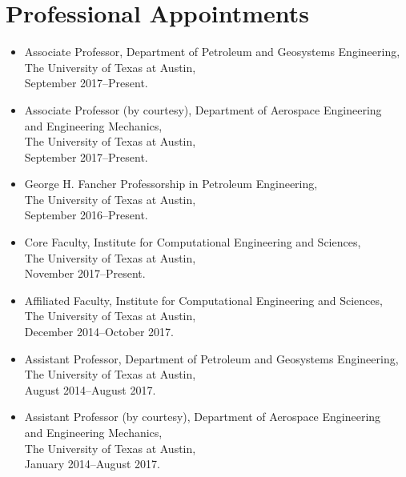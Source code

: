 \ifdefined\ispdf
\section*{Professional Appointments}

\begin{itemize}
    \item Associate Professor, Department of Petroleum and Geosystems Engineering, \\ 
          The University of Texas at Austin, \\
          September 2017--Present. 

    \item Associate Professor (by courtesy), Department of Aerospace Engineering \\ 
          and Engineering Mechanics, \\ 
          The University of Texas at Austin, \\
          September 2017--Present. 

    \item George H. Fancher Professorship in Petroleum Engineering, \\ 
          The University of Texas at Austin, \\
          September 2016--Present. 

    \item Core Faculty, Institute for Computational Engineering and Sciences, \\ 
          The University of Texas at Austin, \\
          November 2017--Present. 

    \item Affiliated Faculty, Institute for Computational Engineering and Sciences, \\ 
          The University of Texas at Austin, \\
          December 2014--October 2017. 

    \item Assistant Professor, Department of Petroleum and Geosystems Engineering, \\ 
          The University of Texas at Austin, \\
          August 2014--August 2017. 

    \item Assistant Professor (by courtesy), Department of Aerospace Engineering \\ 
          and Engineering Mechanics, \\ 
          The University of Texas at Austin, \\
          January 2014--August 2017. 


\end{itemize}
